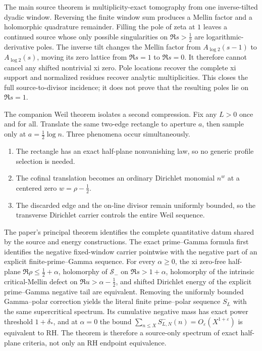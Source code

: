 \documentclass[11pt]{article}
\newcommand{\cS}{\mathcal S}
\begin{document}
The main source theorem is multiplicity-exact tomography from one inverse-tilted dyadic window.
Reversing the finite window sum produces a Mellin factor and a holomorphic quadrature remainder.
Filling the pole of zeta at $1$ leaves a continued source whose only possible singularities on
$\Re s>\frac12$ are logarithmic-derivative poles.  The inverse tilt changes the Mellin factor
from $A_{\log2}(s-1)$ to $A_{\log2}(s)$, moving its zero lattice from $\Re s=1$ to $\Re s=0$.
It therefore cannot cancel any shifted nontrivial xi zero.  Pole locations recover the complete
xi support and normalized residues recover analytic multiplicities.  This closes the full
source-to-divisor incidence; it does not prove that the resulting poles lie on $\Re s=1$.

The companion Weil theorem isolates a second compression.  Fix any $L>0$ once and for all.  Translate the
same two-edge rectangle to aperture $a$, then sample only at $a=\frac12\log n$.  Three phenomena
occur simultaneously.

\begin{enumerate}[label=(\roman*)]
\item The rectangle has an exact half-plane nonvanishing law, so no generic profile selection is
needed.
\item The cofinal translation becomes an ordinary Dirichlet monomial $n^w$ at a centered zero
$w=\rho-\frac12$.
\item The discarded edge and the on-line divisor remain uniformly bounded, so the transverse
Dirichlet carrier controls the entire Weil sequence.
\end{enumerate}

The paper's principal theorem identifies the complete quantitative datum shared by the source and
energy constructions.  The exact prime--Gamma formula first identifies the negative
fixed-window carrier pointwise with the negative part of an explicit finite-prime--Gamma
sequence.  For every $\alpha\ge0$, the xi zero-free half-plane
$\Re\rho\le\frac12+\alpha$, holomorphy of $\cS_-$ on $\Re s>1+\alpha$, holomorphy of the
intrinsic critical-Mellin defect on $\Re u>\alpha-\frac12$, and shifted Dirichlet energy of the
explicit prime--Gamma negative tail are equivalent.  Removing the uniformly bounded
Gamma--polar correction yields the literal finite prime--polar sequence $S_L$ with the same
supercritical spectrum.  Its cumulative negative mass has exact power threshold
$1+\delta_*$, and at $\alpha=0$ the bound
$\sum_{n\le X}S_{L,N}^-(n)=O_\varepsilon(X^{1+\varepsilon})$ is equivalent to RH.  The theorem is
therefore a source-only spectrum of exact half-plane criteria, not only an RH endpoint
equivalence.
\end{document}
